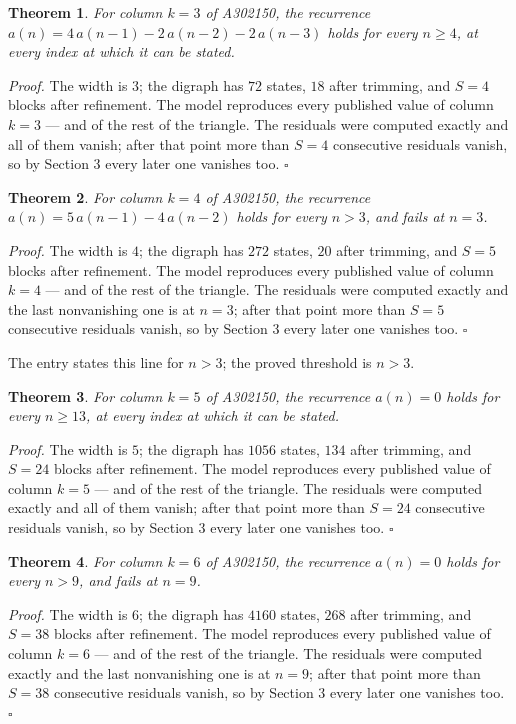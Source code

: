 \documentclass[11pt]{article}
\newtheorem{theorem}{Theorem}
\theoremstyle{definition}
\begin{document}
\begin{theorem} For column $k = 3$ of A302150, the recurrence $a(n) = 4\,a(n-1) - 2\,a(n-2) - 2\,a(n-3)$ holds for every $n \ge 4$, at every index at which it can be stated.\end{theorem}

{\itshape Proof.} The width is $3$; the digraph has $72$ states, $18$ after trimming, and $S = 4$ blocks after refinement. The model reproduces every published value of column $k = 3$ --- and of the rest of the triangle. The residuals were computed exactly and all of them vanish; after that point more than $S = 4$ consecutive residuals vanish, so by Section 3 every later one vanishes too. $\square$

\begin{theorem} For column $k = 4$ of A302150, the recurrence $a(n) = 5\,a(n-1) - 4\,a(n-2)$ holds for every $n > 3$, and fails at $n = 3$.\end{theorem}

{\itshape Proof.} The width is $4$; the digraph has $272$ states, $20$ after trimming, and $S = 5$ blocks after refinement. The model reproduces every published value of column $k = 4$ --- and of the rest of the triangle. The residuals were computed exactly and the last nonvanishing one is at $n = 3$; after that point more than $S = 5$ consecutive residuals vanish, so by Section 3 every later one vanishes too. $\square$

The entry states this line for $n > 3$; the proved threshold is $n > 3$.

\begin{theorem} For column $k = 5$ of A302150, the recurrence $a(n) = 0$ holds for every $n \ge 13$, at every index at which it can be stated.\end{theorem}

{\itshape Proof.} The width is $5$; the digraph has $1056$ states, $134$ after trimming, and $S = 24$ blocks after refinement. The model reproduces every published value of column $k = 5$ --- and of the rest of the triangle. The residuals were computed exactly and all of them vanish; after that point more than $S = 24$ consecutive residuals vanish, so by Section 3 every later one vanishes too. $\square$

\begin{theorem} For column $k = 6$ of A302150, the recurrence $a(n) = 0$ holds for every $n > 9$, and fails at $n = 9$.\end{theorem}

{\itshape Proof.} The width is $6$; the digraph has $4160$ states, $268$ after trimming, and $S = 38$ blocks after refinement. The model reproduces every published value of column $k = 6$ --- and of the rest of the triangle. The residuals were computed exactly and the last nonvanishing one is at $n = 9$; after that point more than $S = 38$ consecutive residuals vanish, so by Section 3 every later one vanishes too. $\square$
\end{document}
